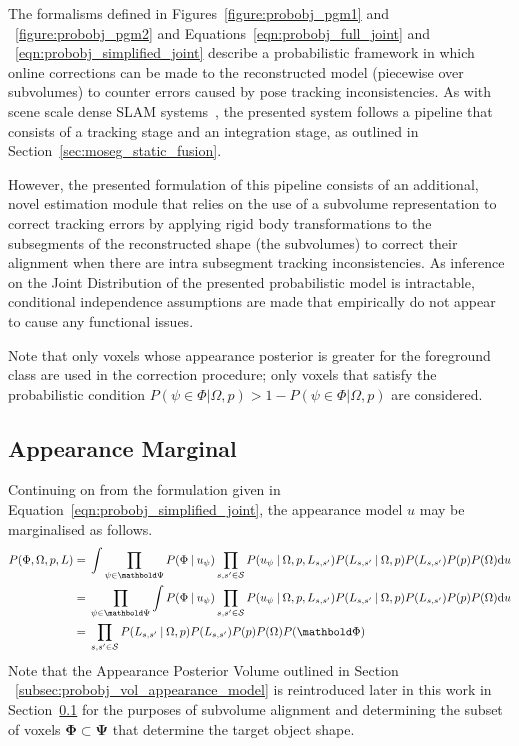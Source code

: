 The formalisms defined in Figures~\ref{figure:probobj_pgm1} and
~\ref{figure:probobj_pgm2} and Equations~\ref{eqn:probobj_full_joint} and
~\ref{eqn:probobj_simplified_joint} describe a probabilistic framework in which
online corrections can be made to the reconstructed model (piecewise over
subvolumes) to counter errors caused by pose tracking inconsistencies. As with
scene scale dense SLAM systems~\cite{Newcombe2011, Prisacariu2014, NieBner2013},
the presented system follows a pipeline that consists of a tracking stage and an
integration stage, as outlined in Section~\ref{sec:moseg_static_fusion}.

However, the presented formulation of this pipeline consists of an
additional, novel estimation module that relies on the use of a subvolume
representation to correct tracking errors by applying rigid body transformations
to the subsegments of the reconstructed shape (the subvolumes) to correct their
alignment when there are intra subsegment tracking inconsistencies. As inference
on the Joint Distribution of the presented probabilistic model is intractable, 
conditional independence assumptions are made that empirically do not appear to 
cause any functional issues. 

Note that only voxels whose appearance posterior is greater for the foreground 
class are used in the correction procedure; only voxels that satisfy the probabilistic 
condition \(P(\psi \in \Phi | \Omega, p) > 1 - P(\psi \in \Phi | \Omega, p)\) are 
considered.

\subsection{Appearance Marginal}
Continuing on from the formulation given in Equation~\ref{eqn:probobj_simplified_joint}, 
the appearance model \(u\) may be marginalised as follows.
\begin{align}
  \label{eqn:probobj_appearance_marginal}
  P(\Phi, \Omega, p, L) ={}&
  \int
  \prod_{\psi \in \bm{\Psi}} P(\Phi \given u_{\psi})
  \prod_{s, s' \in \mathcal{S}}P(u_{\psi} \given \Omega, p, L_{s, s'})
  P(L_{s, s'} \given \Omega, p) P(L_{s, s'})P(p)P(\Omega) \intd{u} \\
  ={}& \prod_{\psi \in \bm{\Psi}} 
  \int P(\Phi \given u_{\psi})
  \prod_{s, s' \in \mathcal{S}}P(u_{\psi} \given \Omega, p, L_{s, s'})
  P(L_{s, s'} \given \Omega, p) P(L_{s, s'})P(p)P(\Omega) \intd{u} \\
  ={}& \prod_{s, s' \in \mathcal{S}} P(L_{s, s'} \given \Omega, p)
  P(L_{s, s'})P(p)P(\Omega)P(\bm{\Phi})
\end{align}
Note that the Appearance Posterior Volume outlined in Section 
~\ref{subsec:probobj_vol_appearance_model} is reintroduced later in this work in
Section~\ref{} for the purposes of subvolume alignment and determining the
subset of voxels \(\bm{\Phi} \subset \bm{\Psi}\) that determine the target
object shape.

